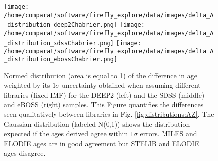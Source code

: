 \documentclass[onecolumn]{aa}
\begin{document}
\begin{figure}
\begin{center}
\caption{\label{fig:distributions:MwA} 
Normed distribution (area is equal to 1) of the difference in age weighted by its $1\sigma$ uncertainty obtained when assuming different libraries (fixed IMF) for the DEEP2 (left) and the SDSS (middle) and eBOSS (right) samples. 
This Figure quantifies the differences seen qualitatively between libraries in Fig. \ref{fig:distributions:AZ}. 
The Gaussian distribution (labeled N(0,1)) shows the distribution expected if the ages derived agree within $1\sigma$ errors. 
MILES and ELODIE ages are in good agreement but STELIB and ELODIE ages disagree.}  
\texttt{[image: /home/comparat/software/firefly\_explore/data/images/delta\_A\_distribution\_deep2Chabrier.png]}
\hspace*{-0.5cm}
\texttt{[image: /home/comparat/software/firefly\_explore/data/images/delta\_A\_distribution\_sdssChabrier.png]}
\hspace*{-0.5cm}
\texttt{[image: /home/comparat/software/firefly\_explore/data/images/delta\_A\_distribution\_ebossChabrier.png]}
\end{center}
\end{figure}
\end{document}
